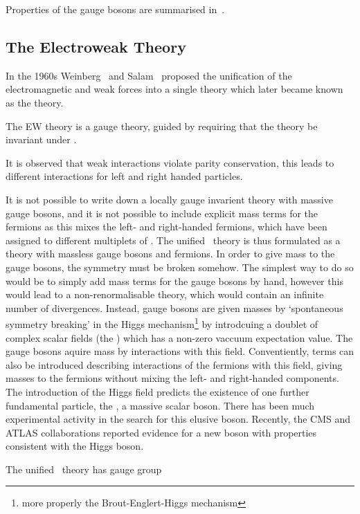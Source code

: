 Properties of the gauge bosons are summarised in~.

\subsection{The Electroweak Theory}

In the 1960s Weinberg~\cite{PhysRevLett.19.1264} and Salam~\cite{Salam1964168} proposed the unification of the electromagnetic
and weak forces into a single theory which later became known as the
 theory.

The EW theory is a gauge theory, guided by requiring that the theory be
invariant under .

It is observed that weak interactions violate parity conservation, this leads to
different interactions for left and right handed particles.

It is not possible to write down a locally gauge invarient theory with massive
gauge bosons, and it is not possible to include explicit mass terms for the
fermions as this mixes the left- and right-handed fermions, which have been
assigned to different multiplets of \sutwo. The unified \ew\ theory is thus
formulated as a theory with massless gauge bosons and fermions. In order to give
mass to the gauge bosons, the symmetry must be broken somehow. The simplest way
to do so would be to simply add mass terms for the gauge bosons by hand, however
this would lead to a non-renormalisable theory, which would contain an infinite
number of divergences. Instead, gauge bosons are given masses by `spontaneous
symmetry breaking' in the Higgs mechanism\footnote{more properly the Brout-Englert-Higgs
mechanism} by introdcuing a doublet of complex scalar fields (the ) which has a non-zero vaccuum expectation value. The gauge bosons aquire
mass by interactions with this field. Conventiently, terms can also be
introduced describing interactions of the fermions with this field, giving
masses to the fermions without mixing the left- and right-handed components. The
introduction of the Higgs field predicts the existence of one further
fundamental particle, the , a massive scalar boson. There has
been much experimental activity in the search for this elusive boson. Recently,
the CMS and ATLAS collaborations reported evidence for a new boson with
properties consistent with the Higgs boson.

The unified \ew\ theory has gauge group


